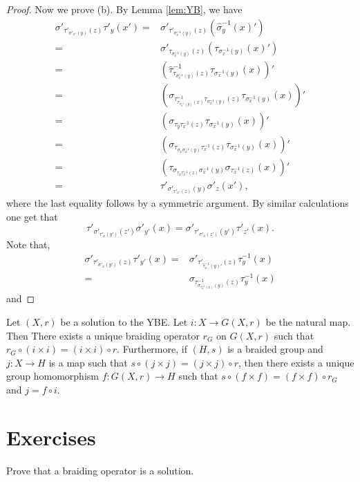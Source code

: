 \begin{proof}
Now we prove (b). By Lemma \ref{lem:YB}, we have
\begin{align*}
    \sigma'_{\tau'_{\sigma'_{x'}(y)}(z)}\tau'_y(x')=&
    \sigma'_{\tau'_{\sigma^{-1}_{x}(y)}(z)}\left(\widehat{\sigma}^{-1}_y(x)'\right)\\
    =&
    \sigma'_{\tau_{\sigma^{-1}_{x}(y)}(z)}\left(\tau_{\sigma^{-1}_x(y)}(x)'\right)\\
    =&
    \left(\widehat{\tau}^{-1}_{\tau_{\sigma^{-1}_{x}(y)}(z)}\tau_{\sigma^{-1}_x(y)}(x)\right)'\\
     =&
    \left(\sigma_{\tau^{-1}_{\tau_{\sigma^{-1}_x(y)}(x)}\tau_{\sigma^{-1}_{x}(y)}(z)}\tau_{\sigma^{-1}_x(y)}(x)\right)'\\
    =&
    \left(\sigma_{\tau_{y}\tau^{-1}_{x}(z)}\tau_{\sigma^{-1}_x(y)}(x)\right)'\\
    =&
    \left(\sigma_{\tau_{\sigma_x\sigma^{-1}_x(y)}\tau^{-1}_{x}(z)}\tau_{\sigma^{-1}_x(y)}(x)\right)'\\
    =&
    \left(\tau_{\sigma_{\tau_x\tau^{-1}_x(z)}\sigma^{-1}_{x}(y)}\sigma_{\tau^{-1}_x(z)}(x)\right)'\\
    =&\tau'_{\sigma'_{\tau'_{x'}(z)}(y)}\sigma'_z(x'),
\end{align*}
where the last equality follows by a symmetric argument. By similar calculations one get that
\[\tau'_{\sigma'_{\tau'_x(y')}(z')}\sigma'_{y'}(x)=\sigma'_{\tau'_{\sigma'_x(z')}(y')}\tau'_{z'}(x).\]
Note that, 
\begin{align*}
    \sigma'_{\tau'_{\sigma'_x(y')}(z)}\tau'_{y'}(x)=&\sigma'_{\tau'_{\widehat{\tau}^{-1}_x(y)'}(z)}\tau^{-1}_y(x)\\
    =&\sigma_{\tau^{-1}_{\sigma_{\tau^{-1}_y(x)}(y)}(z)}\tau^{-1}_y(x)
\end{align*}
and
\end{proof}



\begin{theorem}
\label{thm:LYZ9}
Let $(X,r)$ be a solution to the YBE. Let $i\colon X\rightarrow G(X,r)$ be the natural map. Then There exists a unique braiding operator $r_G$ on $G(X,r)$ such that $r_G\circ (i\times i)=(i\times i)\circ r$. Furthermore, if $(H,s)$ is a braided group and $j\colon X\rightarrow H$ is a map such that
$s\circ (j\times j)=(j\times j)\circ r$, then there exists a unique group homomorphism $f\colon G(X,r)\rightarrow H$ such that $s\circ (f\times f)=(f\times f)\circ r_G$ and $j=f\circ i$.
\end{theorem}

\section*{Exercises}

\begin{prob}
Prove that a braiding operator is a solution. 
\end{prob}

